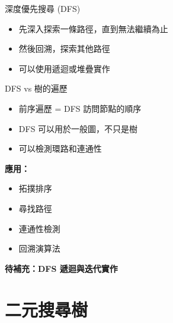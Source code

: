 \documentclass{beamer}
\begin{document}
\begin{frame}{深度優先搜尋 (DFS)}
\begin{itemize}
    \item 先深入探索一條路徑，直到無法繼續為止
    \item 然後回溯，探索其他路徑
    \item 可以使用遞迴或堆疊實作
\end{itemize}

\vspace{1em}
\begin{block}{DFS vs 樹的遍歷}
\begin{itemize}
    \item 前序遍歷 = DFS 訪問節點的順序
    \item DFS 可以用於一般圖，不只是樹
    \item 可以檢測環路和連通性
\end{itemize}
\end{block}

\vspace{1em}
\textbf{應用：}
\begin{itemize}
    \item 拓撲排序
    \item 尋找路徑
    \item 連通性檢測
    \item 回溯演算法
\end{itemize}

\vspace{1em}
\textbf{待補充：DFS 遞迴與迭代實作}
\end{frame}

\section{二元搜尋樹}
\end{document}
